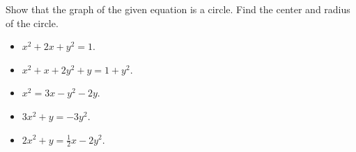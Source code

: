 \begin{frame}
\begin{example}
Show that the graph of the given equation is a circle. Find the center and radius of the circle.

\begin{itemize}
\item $x^2+2x+y^2=1$.
\item $x^2+x+2y^2+y=1+y^2$.
\item $x^2=3x-y^2-2y$.
\item $3x^2+y=-3y^2$.
\item $2x^2+y=\frac{1}{2}x-2y^2$.
\end{itemize}
\end{example}
\end{frame}